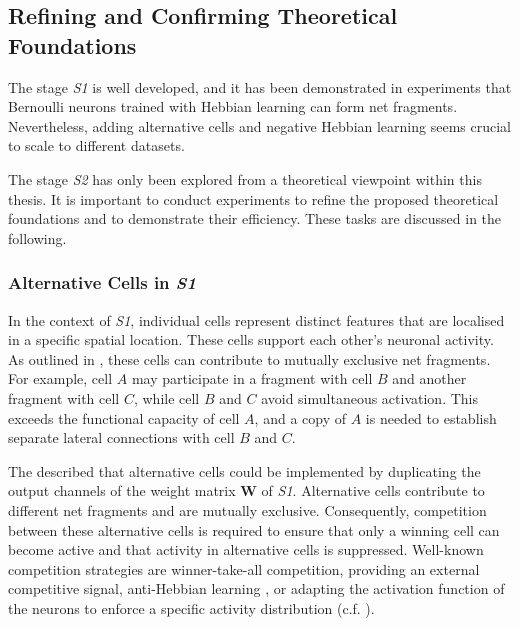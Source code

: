 \subsection{Refining and Confirming Theoretical Foundations}
The stage \emph{S1} is well developed, and it has been demonstrated in experiments that Bernoulli neurons trained with Hebbian learning can form net fragments. Nevertheless, adding alternative cells and negative Hebbian learning seems crucial to scale to different datasets.

The stage \emph{S2} has only been explored from a theoretical viewpoint within this thesis. It is important to conduct experiments to refine the proposed theoretical foundations and to demonstrate their efficiency.
These tasks are discussed in the following.


\subsubsection{Alternative Cells in \emph{S1}}
In the context of \emph{S1}, individual cells represent distinct features that are localised in a specific spatial location. These cells support each other's neuronal activity. As outlined in , these cells can contribute to mutually exclusive net fragments. For example, cell $A$ may participate in a fragment with cell $B$ and another fragment with cell $C$, while cell $B$ and $C$ avoid simultaneous activation. This exceeds the functional capacity of cell $A$, and a copy of $A$ is needed to establish separate lateral connections with cell $B$ and $C$.

The  described that alternative cells could be implemented by duplicating the output channels of the weight matrix $\boldsymbol{W}$ of \emph{S1}.
Alternative cells contribute to different net fragments and are mutually exclusive.
Consequently, competition between these alternative cells is required to ensure that only a winning cell can become active and that activity in alternative cells is suppressed.
Well-known competition strategies are winner-take-all competition, providing an external competitive signal, anti-Hebbian learning , or adapting the activation function of the neurons to enforce a specific activity distribution  (c.f. ).

